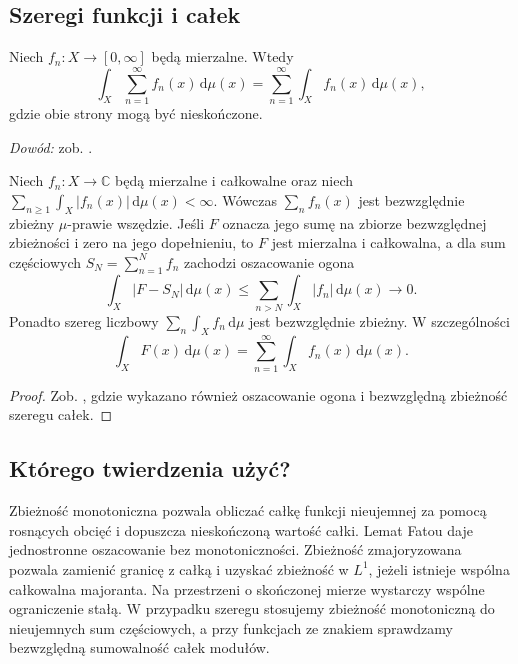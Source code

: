 \subsection{Szeregi funkcji i całek}


\begin{twierdzenie}
\label{thm:sum-nonnegative-integrals}
Niech $f_n:X\to[0,\infty]$ będą mierzalne. Wtedy
\begin{equation}\label{eq:sum-nonnegative-integrals}
\int_X\sum_{n=1}^{\infty}f_n(x)\,\mathrm d\mu(x)
=\sum_{n=1}^{\infty}\int_Xf_n(x)\,\mathrm d\mu(x),
\end{equation}
gdzie obie strony mogą być nieskończone.
\end{twierdzenie}
\noindent\emph{Dowód:} zob. .

\begin{twierdzenie}
\label{thm:sum-absolutely-integrable}
Niech $f_n:X\to\mathbb C$ będą mierzalne i
całkowalne oraz niech
$\sum_{n\ge1}\int_X|f_n(x)|\,\mathrm d\mu(x)<\infty$.
Wówczas $\sum_nf_n(x)$ jest bezwzględnie zbieżny
$\mu$-prawie wszędzie. Jeśli $F$ oznacza jego sumę
na zbiorze bezwzględnej zbieżności i zero na jego dopełnieniu,
to $F$ jest mierzalna i całkowalna, a dla sum częściowych $S_N=\sum_{n=1}^N f_n$
zachodzi oszacowanie ogona
\[
 \int_X|F-S_N|\,\mathrm d\mu(x)\le
 \sum_{n>N}\int_X|f_n|\,\mathrm d\mu(x)\longrightarrow0.
\]
Ponadto szereg liczbowy $\sum_n\int_X f_n\,\mathrm d\mu$
jest bezwzględnie zbieżny.
W szczególności
\begin{equation}\label{eq:interchange-series}
\int_XF(x)\,\mathrm d\mu(x)
=\sum_{n=1}^{\infty}\int_Xf_n(x)\,\mathrm d\mu(x).
\end{equation}
\end{twierdzenie}
\begin{proof}
Zob. ,
gdzie wykazano również oszacowanie ogona
i bezwzględną zbieżność szeregu całek.
\end{proof}


\subsection{Którego twierdzenia użyć?}
Zbieżność monotoniczna pozwala obliczać całkę funkcji
nieujemnej za pomocą rosnących obcięć i dopuszcza
nieskończoną wartość całki. Lemat Fatou daje jednostronne
oszacowanie bez monotoniczności. Zbieżność zmajoryzowana
pozwala zamienić granicę z całką i uzyskać zbieżność w $L^1$,
jeżeli istnieje wspólna całkowalna majoranta.
Na przestrzeni o skończonej mierze wystarczy wspólne
ograniczenie stałą. W przypadku szeregu stosujemy
zbieżność monotoniczną do nieujemnych sum częściowych,
a przy funkcjach ze znakiem sprawdzamy bezwzględną
sumowalność całek modułów.

